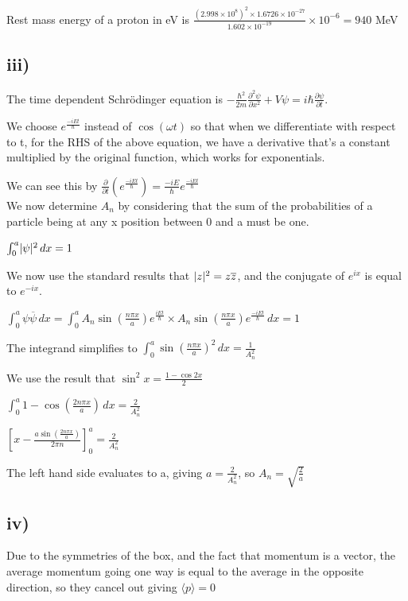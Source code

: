 \documentclass{article}
\DeclarePairedDelimiter{\abs}{\lvert}{\rvert}
\begin{document}
Rest mass energy of a proton in eV is $\frac{(2.998\times10^{8})^2 \times 1.6726 \times 10^{-27}} {1.602 \times 10^{-19}} \times 10^{-6} = 940$ MeV


\subsection*{iii)}

The time dependent Schrödinger equation is $ -\frac{\hbar^2}{2m}\frac{\partial^2\psi}{\partial x^2} + V\psi = i\hbar\frac{\partial\psi}{\partial t}$.

We choose $e^{\frac{-iEt}{\hbar}}$ instead of $\cos{(\omega t)}$ so that when we differentiate with respect to t, for the RHS of the above equation, we have a derivative that's a constant multiplied by the original function, which works for exponentials. 

We can see this by $\frac{\partial}{\partial t} (e^{\frac{-iEt}{\hbar}}) = \frac{-iE}{\hbar}e^{\frac{-iEt}{\hbar}}$
\\

We now determine $A_n$ by considering that the sum of the probabilities of a particle being at any x position between 0 and a must be one.

$\int_0^a \abs{\psi}^2   \,dx = 1$

We now use the standard results that $\abs{z}^2 = z\overline{z}$, and the conjugate of $e^{ix}$ is equal to $e^{-ix}$.

$\int_0^a \psi \overline{\psi}   \,dx = 
\int_0^a A_n \sin({\frac{n\pi x}{a}}) e^{\frac{iEt}{\hbar}} \times A_n \sin({\frac{n\pi x}{a}}) e^{\frac{-iEt}{\hbar}}  \,dx = 1$

The integrand simplifies to $\int_0^a \sin{(\frac{n\pi x}{a})^2}   \,dx = \frac{1}{A_n^2}$

We use the result that $\sin^2x = \frac{1-\cos{2x}}{2}$

$\int_0^a 1 - \cos(\frac{2n\pi x}{a})   \,dx = \frac{2}{A_n^2}$

$[x - \frac{a\sin({\frac{2n\pi x}{a}})}{2\pi n}]_0^a = \frac{2}{A_n^2}$ 

The left hand side evaluates to a, giving $a = \frac{2}{A_n^2}$, so $A_n = \sqrt{\frac{2}{a}}$

\subsection*{iv)}

Due to the symmetries of the box, and the fact that momentum is a vector, the average momentum going one way is equal to the average in the opposite direction, so they cancel out giving $\langle p \rangle = 0$
\end{document}
